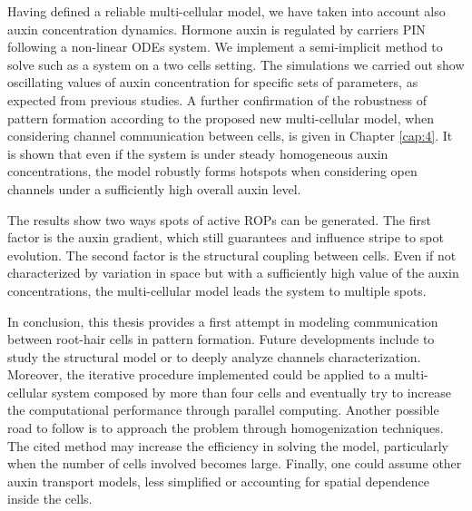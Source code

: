 Having defined a reliable multi-cellular model, we have taken into account also auxin concentration dynamics. Hormone auxin is regulated by carriers PIN following a non-linear ODEs system. We implement a semi-implicit method to solve such as a system on a two cells setting. The simulations we carried out show oscillating values of auxin concentration for specific sets of parameters, as expected from previous studies. A further confirmation of the robustness of pattern formation according to the proposed new multi-cellular model, when considering channel communication between cells, is given in Chapter \ref{cap:4}. It is shown that even if the system is under steady homogeneous auxin concentrations, the model robustly forms hotspots when considering open channels under a sufficiently high overall auxin level.

The results show two ways spots of active ROPs can be generated. The first factor is the auxin gradient, which still guarantees and influence stripe to spot evolution. The second factor is the structural coupling between cells. Even if not characterized by variation in space but with a sufficiently high value of the auxin concentrations, the multi-cellular model leads the system to multiple spots.

In conclusion, this thesis provides a first attempt in modeling communication between root-hair cells in pattern formation. Future developments include to study the structural model or to deeply analyze channels characterization. Moreover, the iterative procedure implemented could be applied to a multi-cellular system composed by more than four cells and eventually try to increase the computational performance through parallel computing. Another possible road to follow is to approach the problem through homogenization techniques. The cited method may increase the efficiency in solving the model, particularly when the number of cells involved becomes large. Finally, one could assume other auxin transport models, less simplified or accounting for spatial dependence inside the cells.

